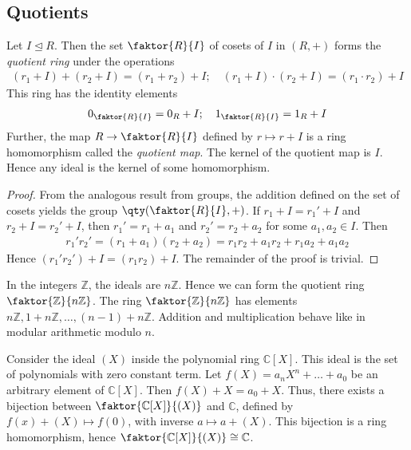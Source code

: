 \subsection{Quotients}
\begin{theorem}
	Let $I \trianglelefteq R$.
	Then the set $\faktor{R}{I}$ of cosets of $I$ in $(R, +)$ forms the \textit{quotient ring} under the operations
	\begin{align*}
		(r_1 + I) + (r_2 + I) = (r_1 + r_2) + I;\quad (r_1 + I) \cdot (r_2 + I) = (r_1 \cdot r_2) + I
	\end{align*}
	This ring has the identity elements
	\begin{align*}
		0_{\faktor{R}{I}} = 0_R + I;\quad 1_{\faktor{R}{I}} = 1_R + I
	\end{align*}
	Further, the map $R \to \faktor{R}{I}$ defined by $r \mapsto r + I$ is a ring homomorphism called the \textit{quotient map}.
	The kernel of the quotient map is $I$.
	Hence any ideal is the kernel of some homomorphism.
\end{theorem}
\begin{proof}
	From the analogous result from groups, the addition defined on the set of cosets yields the group $\qty(\faktor{R}{I}, +)$.
	If $r_1 + I = r_1' + I$ and $r_2 + I = r_2' + I$, then $r_1' = r_1 + a_1$ and $r_2' = r_2 + a_2$ for some $a_1, a_2 \in I$.
	Then
	\begin{align*}
		r_1' r_2' = (r_1 + a_1)(r_2 + a_2) = r_1 r_2 + a_1 r_2 + r_1 a_2 + a_1 a_2
	\end{align*}
	Hence $(r_1' r_2') + I = (r_1 r_2) + I$.
	The remainder of the proof is trivial.
\end{proof}
\begin{example}
	In the integers $\mathbb Z$, the ideals are $n\mathbb Z$.
	Hence we can form the quotient ring $\faktor{\mathbb Z}{n\mathbb Z}$.
	The ring $\faktor{\mathbb Z}{n\mathbb Z}$ has elements $n\mathbb Z, 1 + n\mathbb Z, \dots, (n-1) + n\mathbb Z$.
	Addition and multiplication behave like in modular arithmetic modulo $n$.
\end{example}
\begin{example}
	Consider the ideal $(X)$ inside the polynomial ring $\mathbb C[X]$.
	This ideal is the set of polynomials with zero constant term.
	Let $f(X) = a_n X^n + \dots + a_0$ be an arbitrary element of $\mathbb C[X]$.
	Then $f(X) + X = a_0 + X$.
	Thus, there exists a bijection between $\faktor{\mathbb C[X]}{(X)}$ and $\mathbb C$, defined by $f(x) + (X) \mapsto f(0)$, with inverse $a \mapsto a + (X)$.
	This bijection is a ring homomorphism, hence $\faktor{\mathbb C[X]}{(X)} \cong \mathbb C$.
\end{example}
